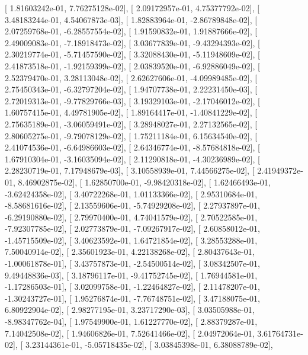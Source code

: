 \documentclass{article}
\begin{document}
       [ 1.81603242e-01,  7.76275128e-02],
       [ 2.09172957e-01,  4.75377792e-02],
       [ 3.48183244e-01,  4.54067873e-03],
       [ 1.82883964e-01, -2.86789848e-02],
       [ 2.07259768e-01, -6.28557554e-02],
       [ 1.91590832e-01,  1.91887666e-02],
       [ 2.49009083e-01, -7.18918473e-02],
       [ 3.03677839e-01, -9.43294393e-02],
       [ 2.30219774e-01, -5.71457590e-02],
       [ 3.32088430e-01, -5.11948609e-02],
       [ 2.41873518e-01, -1.92159399e-02],
       [ 2.03839520e-01, -6.92886049e-02],
       [ 2.52379470e-01,  3.28113048e-02],
       [ 2.62627606e-01, -4.09989485e-02],
       [ 2.75450343e-01, -6.32797204e-02],
       [ 1.94707738e-01,  2.22231450e-03],
       [ 2.72019313e-01, -9.77829766e-03],
       [ 3.19329103e-01, -2.17046012e-02],
       [ 1.60757415e-01,  4.49781905e-02],
       [ 1.89164417e-01, -1.40841229e-02],
       [ 2.75635189e-01, -3.06059491e-02],
       [ 3.28948027e-01,  2.27132565e-02],
       [ 2.80605275e-01, -9.79078129e-02],
       [ 1.75211184e-01,  6.15634540e-02],
       [ 2.41074536e-01, -6.64986603e-02],
       [ 2.64346774e-01, -8.57684818e-02],
       [ 1.67910304e-01, -3.16035094e-02],
       [ 2.11290818e-01, -4.30236989e-02],
       [ 2.28230719e-01,  7.17948679e-03],
       [ 3.10558939e-01,  7.44566275e-02],
       [ 2.41949372e-01,  8.46902875e-02],
       [ 1.62850700e-01, -9.98420318e-02],
       [ 1.62466493e-01, -3.62424358e-02],
       [ 3.40722268e-01,  1.01133366e-02],
       [ 2.95310684e-01, -8.58681616e-02],
       [ 2.13559606e-01, -5.74929208e-02],
       [ 2.27937897e-01, -6.29190880e-02],
       [ 2.79970400e-01,  4.74041579e-02],
       [ 2.70522585e-01, -7.92307785e-02],
       [ 2.02773879e-01, -7.09267917e-02],
       [ 2.60858012e-01, -1.45715509e-02],
       [ 3.40623592e-01,  1.64721854e-02],
       [ 3.28553288e-01,  7.50040914e-02],
       [ 2.35601923e-01,  4.22138268e-02],
       [ 2.80437643e-01, -1.00061878e-01],
       [ 3.43757873e-01, -2.54500514e-02],
       [ 3.08342507e-01,  9.49448836e-03],
       [ 3.18796117e-01, -9.41752745e-02],
       [ 1.76944581e-01, -1.17286503e-01],
       [ 3.02099758e-01, -1.22464827e-02],
       [ 2.11478207e-01, -1.30243727e-01],
       [ 1.95276874e-01, -7.76748751e-02],
       [ 3.47188075e-01,  6.80922904e-02],
       [ 2.98277195e-01,  3.23717290e-03],
       [ 3.03505988e-01, -8.98347762e-04],
       [ 1.97549900e-01,  1.61227770e-02],
       [ 2.88379287e-01,  7.14042508e-02],
       [ 1.94606826e-01,  7.52641466e-02],
       [ 2.04972064e-01,  3.61764731e-02],
       [ 3.23144361e-01, -5.05718435e-02],
       [ 3.03845398e-01,  6.38088789e-02],
\end{document}
